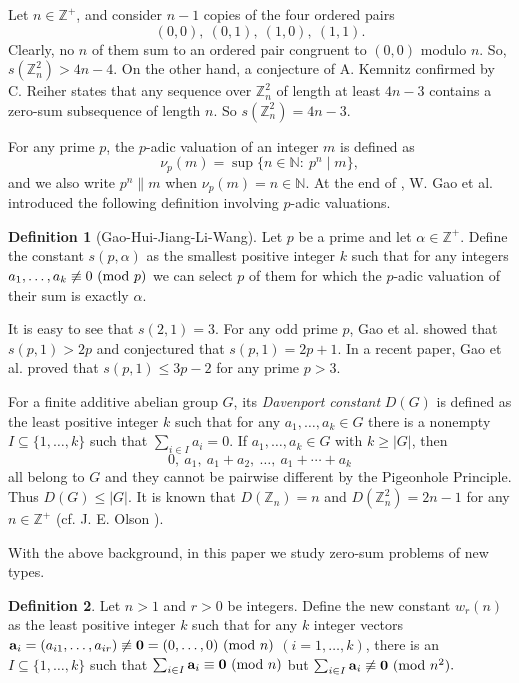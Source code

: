 \documentclass[11pt,reqno]{amsart}
\def\pmod #1{\ ({\rm{mod}}\ #1)}
\def\Z{\mathbb Z}
\def\N{\mathbb N}
\def\ls{\leqslant}
\def\gs{\geqslant}
\def\se {\subseteq}
\def\al{\alpha}
\def\eq{\equiv}
\theoremstyle{plain}
\theoremstyle{definition}
\newtheorem{definition}{Definition}
\theoremstyle{remark}
\begin{document}
Let $n\in\Z^+$, and consider $n-1$ copies of the four ordered pairs
$$(0,0),\ (0,1),\ (1,0),\ (1,1).$$
Clearly, no $n$ of them sum to an ordered pair congruent to $(0,0)$ modulo $n$.
So, $s(\Z_n^2)>4n-4$. On the other hand,
a conjecture of A. Kemnitz \cite{K} confirmed by C. Reiher \cite{R}
states that any sequence over $\Z_n^2$ of length at least $4n-3$
contains a zero-sum subsequence of length $n$. So $s(\Z_n^2)=4n-3$.


 For any prime $p$,
the $p$-adic valuation of an integer $m$ is defined as
$$\nu_p(m)=\sup\{n\in\N:\ p^n\mid m\},$$
and we also write $p^n\|m$ when $\nu_p(m)=n\in\N$.
At the end of \cite{G25}, W. Gao et al. introduced the following definition involving $p$-adic valuations.

\begin{definition} [Gao-Hui-Jiang-Li-Wang] Let $p$ be a prime and let $\al\in\Z^+$. Define the constant $s(p,\al)$ as
the smallest positive integer $k$ such that for any integers
$a_1,\ldots,a_k\not\eq0\pmod p$ we can select $p$ of them for which the $p$-adic valuation of their sum is exactly $\al$.
\end{definition}

It is easy to see that $s(2,1)=3$.
For any odd prime $p$, Gao et al. \cite{G25} showed that $s(p,1)>2p$ and conjectured that $s(p,1)=2p+1$. In a recent paper, Gao et al. \cite{G26} proved that $s(p,1)\ls 3p-2$ for any prime $p>3$.

For a finite additive abelian group $G$, its {\it Davenport constant} $D(G)$ is defined as the least positive integer $k$ such that for any $a_1,\ldots,a_k\in G$ there is a nonempty
$I\se\{1,\ldots,k\}$ such that $\sum_{i\in I}a_i=0$. If $a_1,\ldots,a_k\in G$ with $k\gs|G|$, then
$$0,\ a_1,\ a_1+a_2,\ \ldots,\ a_1+\cdots +a_k$$
all belong to $G$ and they cannot be pairwise different by the Pigeonhole Principle.
 Thus $D(G)\ls |G|$.  It is known that $D(\Z_n)=n$ and $D(\Z_n^2)=2n-1$ for any $n\in\Z^+$ (cf. J. E. Olson \cite{O}).

With the above background, in this paper we study zero-sum problems of new types.


\begin{definition}\label{Def-w} Let $n>1$ and $r>0$ be integers. Define the new constant $w_r(n)$ as the least positive integer $k$ such that for any $k$ integer vectors ${\bf a}_i=(a_{i1},\ldots,a_{ir})\not\eq{\bf 0}=(0,\ldots,0)\pmod n$ $(i=1,\ldots,k)$, there is an $I\se\{1,\ldots,k\}$ such that
$\sum_{i\in I}{\bf a}_i\equiv{\bf 0}\pmod n$ but $\sum_{i\in I}{\bf a}_i\not\equiv{\bf 0}\pmod {n^2}.$
\end{definition}
\end{document}
